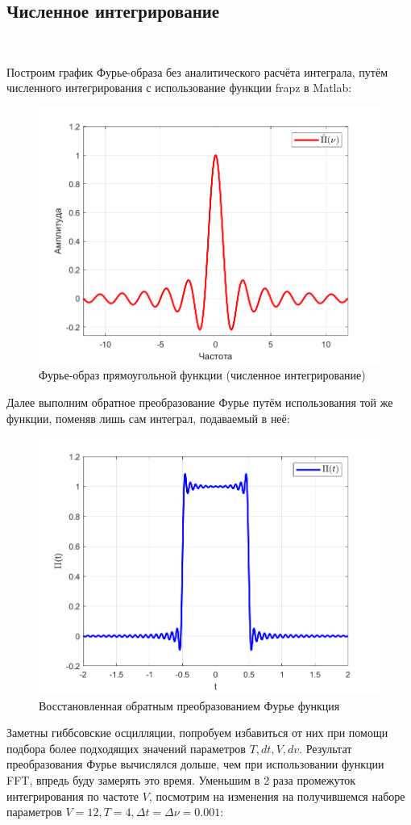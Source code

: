 \documentclass[a4paper]{article}
\begin{document}
\subsection{Численное интегрирование}\

Построим график Фурье-образа без аналитического расчёта интеграла, путём численного интегрирования с использование функции frapz в Matlab:

\begin{figure}[H]
    \centering
    \includegraphics[width=0.55\linewidth]{graphs/fourier_numerical.png}
    \caption{Фурье-образ прямоугольной функции (численное интегрирование)}
\end{figure}

Далее выполним обратное преобразование Фурье путём использования той же функции, поменяв лишь сам интеграл, подаваемый в неё:

\begin{figure}[H]
    \centering
    \includegraphics[width=0.55\linewidth]{graphs/func_inversed_fourier.png}
    \caption{Восстановленная обратным преобразованием Фурье функция}
\end{figure}

Заметны гиббсовские осцилляции, попробуем избавиться от них при помощи подбора более подходящих значений параметров $T, dt, V, dv$. Результат преобразования Фурье вычислялся дольше, чем при использовании функции FFT, впредь буду замерять это время. Уменьшим в 2 раза промежуток интегрирования по частоте $V$, посмотрим на изменения на получившемся наборе параметров $V = 12, T = 4, \Delta t=\Delta \nu=0.001$:
\end{document}
